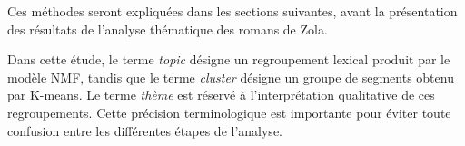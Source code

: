Ces méthodes seront expliquées dans les sections suivantes, avant la présentation des résultats de l'analyse thématique des romans de Zola.

Dans cette étude, le terme \textit{topic} désigne un regroupement lexical produit par le modèle NMF, tandis que le terme \textit{cluster} désigne un groupe de segments obtenu par K-means. Le terme \textit{thème} est réservé à l'interprétation qualitative de ces regroupements. Cette précision terminologique est importante pour éviter toute confusion entre les différentes étapes de l'analyse.